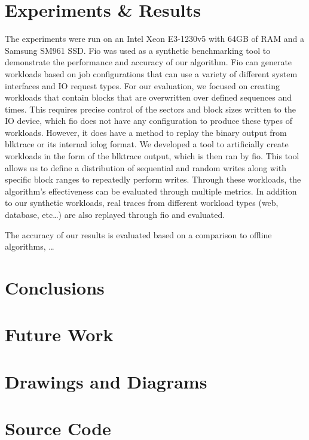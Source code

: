 \documentclass[MEng]{uofl}
\begin{document}
\chapter{Experiments \& Results}
The experiments were run on an Intel Xeon E3-1230v5 with 64GB of RAM and a Samsung SM961 SSD. Fio was used as a synthetic benchmarking tool to demonstrate the performance and accuracy of our algorithm. Fio can generate workloads based on job configurations that can use a variety of different system interfaces and IO request types. For our evaluation, we focused on creating workloads that contain blocks that are overwritten over defined sequences and times. This requires precise control of the sectors and block sizes written to the IO device, which fio does not have any configuration to produce these types of workloads. However, it does have a method to replay the binary output from blktrace or its internal iolog format. We developed a tool to artificially create workloads in the form of the blktrace output, which is then ran by fio. This tool allows us to define a distribution of sequential and random writes along with specific block ranges to repeatedly perform writes. Through these workloads, the algorithm’s effectiveness can be evaluated through multiple metrics. In addition to our synthetic workloads, real traces from different workload types (web, database, etc…) are also replayed through fio and evaluated. 

The accuracy of our results is evaluated based on a comparison to offline algorithms, …

\chapter{Conclusions}

\chapter{Future Work}


\appendix
\chapter{Drawings and Diagrams}
\chapter{Source Code}



\begin{thebibliography}{99}

\end{thebibliography}
\end{document}
